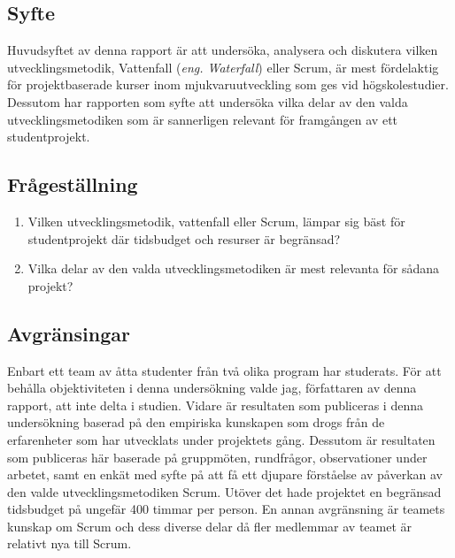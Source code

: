 \subsection{Syfte}
Huvudsyftet av denna rapport är att undersöka, analysera och diskutera vilken utvecklingsmetodik, Vattenfall (\textit{eng. Waterfall}) eller Scrum,
är mest fördelaktig för projektbaserade kurser inom mjukvaruutveckling som ges vid högskolestudier. Dessutom har rapporten som syfte att undersöka vilka delar av den valda utvecklingsmetodiken som är sannerligen relevant för framgången av ett studentprojekt.

\subsection{Frågeställning}
\label{subsec:Lieth_Wahid-research-questions}

\begin{enumerate}
	
	\item Vilken utvecklingsmetodik, vattenfall eller Scrum, lämpar sig bäst för studentprojekt där tidsbudget och resurser är begränsad? \label{LeyQ1}
	
	\item  Vilka delar av den valda utvecklingsmetodiken är mest relevanta för sådana projekt? \label{LeyQ2}
	
\end{enumerate}

\subsection{Avgränsingar}
\label{subsec:Lieth_Wahid-delimitations}
Enbart ett team av åtta studenter från två olika program har studerats. För att behålla objektiviteten i denna undersökning valde jag, författaren av denna rapport, att inte delta i studien. Vidare är resultaten som publiceras i denna undersökning baserad på den empiriska kunskapen som drogs från de erfarenheter som har utvecklats under projektets gång. Dessutom är resultaten som publiceras här baserade på gruppmöten, rundfrågor, observationer under arbetet, samt en enkät med syfte på att få ett djupare förståelse av påverkan av den valde utvecklingsmetodiken Scrum. Utöver det hade projektet en begränsad tidsbudget på ungefär 400 timmar per person. En annan avgränsning är teamets kunskap om Scrum och dess diverse delar då fler medlemmar av teamet är relativt nya till Scrum.



